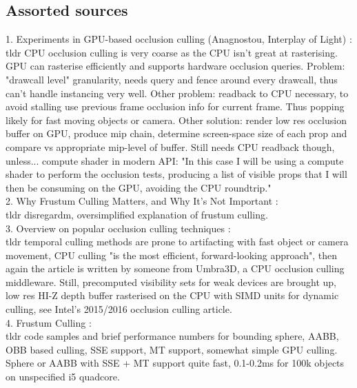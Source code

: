 \subsection{Assorted sources}
1. Experiments in GPU-based occlusion culling (Anagnostou, Interplay of Light) \cite{Anagnostou.2017}: \\
tldr CPU occlusion culling is very coarse as the CPU isn't great at rasterising. GPU can rasterise efficiently and supports hardware occlusion queries. Problem: "drawcall level" granularity, needs query and fence around every drawcall, thus can't handle instancing very well. Other problem: readback to CPU necessary, to avoid stalling use previous frame occlusion info for current frame. Thus popping likely for fast moving objects or camera. 
Other solution: render low res occlusion buffer on GPU, produce mip chain, determine screen-space size of each prop and compare vs appropriate mip-level of buffer. Still needs CPU readback though, unless... compute shader in modern API: "In this case I will be using a compute shader to perform the occlusion tests, producing a list of visible props that I will then be consuming on the GPU, avoiding the CPU roundtrip."\\

2. Why Frustum Culling Matters, and Why It's Not Important \cite{Barrett.2017}: \\
tldr disregardm, oversimplified explanation of frustum culling.\\

3. Overview on popular occlusion culling techniques \cite{gamesindustry.biz.2016}: \\
tldr temporal culling methods are prone to artifacting with fast object or camera movement, CPU culling "is the most efficient, forward-looking approach", then again the article is written by someone from Umbra3D, a CPU occlusion culling middleware. 
Still, precomputed visibility sets for weak devices are brought up, low res HI-Z depth buffer rasterised on the CPU with SIMD units for dynamic culling, see Intel's 2015/2016 occlusion culling article.\\

4. Frustum Culling \cite{Gerlits.2017}: \\
tldr code samples and brief performance numbers for bounding sphere, AABB, OBB based culling, SSE support, MT support, somewhat simple GPU culling. Sphere or AABB with SSE + MT support quite fast, 0.1-0.2ms for 100k objects on unspecified i5 quadcore.\\

